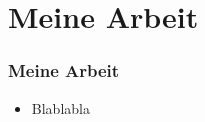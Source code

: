 \section{Meine Arbeit}

\begin{frame}
	\frametitle{Meine Arbeit}
	\begin{itemize}
		\item Blablabla
	\end{itemize}
\end{frame}
